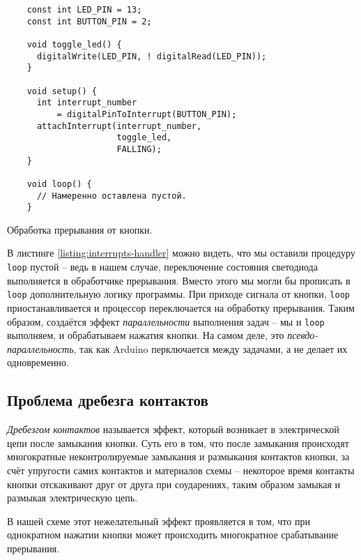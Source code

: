 \documentclass[../sparc.tex]{subfiles}
\begin{document}
\begin{listing}[H]
  \begin{verbatim}
    const int LED_PIN = 13;
    const int BUTTON_PIN = 2;

    void toggle_led() {
      digitalWrite(LED_PIN, ! digitalRead(LED_PIN));
    }

    void setup() {
      int interrupt_number
          = digitalPinToInterrupt(BUTTON_PIN);
      attachInterrupt(interrupt_number,
                      toggle_led,
                      FALLING);
    }

    void loop() {
      // Намеренно оставлена пустой.
    }
  \end{verbatim}
  \caption{Обработка прерывания от кнопки.}
  \label{listing:interrupts-handler}
\end{listing}

В листинге \ref{listing:interrupts-handler} можно видеть, что мы оставили
процедуру \texttt{loop} пустой -- ведь в нашем случае, переключение
состояния светодиода выполняется в обработчике прерывания.  Вместо этого мы
могли бы прописать в \texttt{loop} дополнительную логику программы.
При приходе сигнала от кнопки, \texttt{loop} приостанавливается и
процессор переключается на обработку прерывания.  Таким образом, создаётся
эффект \emph{параллельности} выполнения задач -- мы и \texttt{loop}
выполняем, и обрабатываем нажатия кнопки.  На самом деле, это
\emph{псевдо-параллельность}, так как Arduino перключается между задачами, а не
делает их одновременно.

\subsection{Проблема дребезга контактов}
\label{subsection:button-debounce}

\emph{Дребезгом контактов} называется эффект, который возникает в электрической
цепи после замыкания кнопки.  Суть его в том, что после замыкания происходят
многократные неконтролируемые замыкания и размыкания контактов кнопки, за счёт
упругости самих контактов и материалов схемы -- некоторое время контакты кнопки
отскакивают друг от друга при соударениях, таким образом замыкая и размыкая
электрическую цепь.

В нашей схеме этот нежелательный эффект проявляется в том, что при однократном
нажатии кнопки может происходить многократное срабатывание прерывания.
\end{document}
